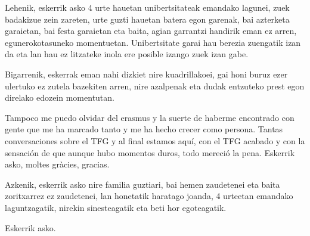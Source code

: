 \thispagestyle{empty}

Lehenik, eskerrik asko 4 urte hauetan unibertsitateak emandako lagunei, zuek badakizue zein zareten, urte guzti hauetan batera egon garenak, bai azterketa garaietan, bai festa garaietan eta baita, agian garrantzi handirik eman ez arren, egunerokotasuneko momentuetan. Unibertsitate garai hau berezia zuengatik izan da eta lan hau ez litzateke inola ere posible izango zuek izan gabe. 


Bigarrenik, eskerrak eman nahi dizkiet nire kuadrillakoei, gai honi buruz ezer ulertuko ez zutela bazekiten arren, nire azalpenak eta dudak entzuteko prest egon direlako edozein momentutan.


Tampoco me puedo olvidar del erasmus y la suerte de haberme encontrado con gente que me ha marcado tanto y me ha hecho crecer como persona. Tantas conversaciones sobre el TFG y al final estamos aquí, con el TFG acabado y con la sensación de que aunque hubo momentos duros, todo mereció la pena. Eskerrik asko, moltes gràcies, gracias.

Azkenik, eskerrik asko nire familia guztiari, bai hemen zaudetenei eta baita zoritxarrez ez zaudetenei, lan honetatik haratago joanda, 4 urteetan emandako laguntzagatik, nirekin sinesteagatik eta beti hor egoteagatik. 

Eskerrik asko.